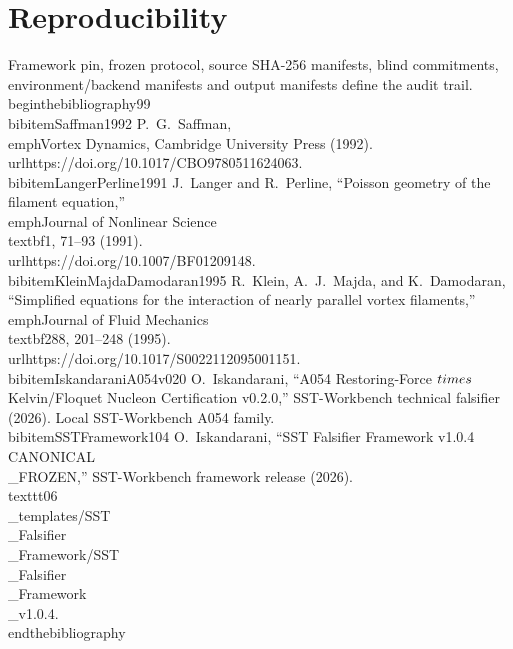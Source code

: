\documentclass[11pt]{article}
\begin{document}
\section{Reproducibility} Framework pin, frozen protocol, source SHA-256 manifests, blind commitments, environment/backend manifests and output manifests define the audit trail.
\\begin{thebibliography}{99}
\\bibitem{Saffman1992} P.~G.~Saffman, \\emph{Vortex Dynamics}, Cambridge University Press (1992). \\url{https://doi.org/10.1017/CBO9780511624063}.
\\bibitem{LangerPerline1991} J.~Langer and R.~Perline, ``Poisson geometry of the filament equation,'' \\emph{Journal of Nonlinear Science} \\textbf{1}, 71--93 (1991). \\url{https://doi.org/10.1007/BF01209148}.
\\bibitem{KleinMajdaDamodaran1995} R.~Klein, A.~J.~Majda, and K.~Damodaran, ``Simplified equations for the interaction of nearly parallel vortex filaments,'' \\emph{Journal of Fluid Mechanics} \\textbf{288}, 201--248 (1995). \\url{https://doi.org/10.1017/S0022112095001151}.
\\bibitem{IskandaraniA054v020} O.~Iskandarani, ``A054 Restoring-Force $\\times$ Kelvin/Floquet Nucleon Certification v0.2.0,'' SST-Workbench technical falsifier (2026). Local SST-Workbench A054 family.
\\bibitem{SSTFramework104} O.~Iskandarani, ``SST Falsifier Framework v1.0.4 CANONICAL\\_FROZEN,'' SST-Workbench framework release (2026). \\texttt{06\\_templates/SST\\_Falsifier\\_Framework/SST\\_Falsifier\\_Framework\\_v1.0.4}.
\\end{thebibliography}
\end{document}
